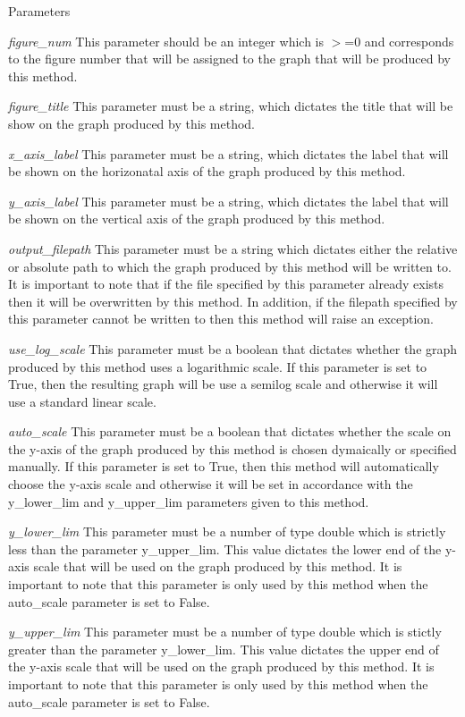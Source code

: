 \begin{DoxyParams}{Parameters}
\item[{\em figure\_\-num}]This parameter should be an integer which is $>$=0 and corresponds to the figure number that will be assigned to the graph that will be produced by this method. \item[{\em figure\_\-title}]This parameter must be a string, which dictates the title that will be show on the graph produced by this method. \item[{\em x\_\-axis\_\-label}]This parameter must be a string, which dictates the label that will be shown on the horizonatal axis of the graph produced by this method. \item[{\em y\_\-axis\_\-label}]This parameter must be a string, which dictates the label that will be shown on the vertical axis of the graph produced by this method. \item[{\em output\_\-filepath}]This parameter must be a string which dictates either the relative or absolute path to which the graph produced by this method will be written to. It is important to note that if the file specified by this parameter already exists then it will be overwritten by this method. In addition, if the filepath specified by this parameter cannot be written to then this method will raise an exception. \item[{\em use\_\-log\_\-scale}]This parameter must be a boolean that dictates whether the graph produced by this method uses a logarithmic scale. If this parameter is set to True, then the resulting graph will be use a semilog scale and otherwise it will use a standard linear scale. \item[{\em auto\_\-scale}]This parameter must be a boolean that dictates whether the scale on the y-\/axis of the graph produced by this method is chosen dymaically or specified manually. If this parameter is set to True, then this method will automatically choose the y-\/axis scale and otherwise it will be set in accordance with the y\_\-lower\_\-lim and y\_\-upper\_\-lim parameters given to this method. \item[{\em y\_\-lower\_\-lim}]This parameter must be a number of type double which is strictly less than the parameter y\_\-upper\_\-lim. This value dictates the lower end of the y-\/axis scale that will be used on the graph produced by this method. It is important to note that this parameter is only used by this method when the auto\_\-scale parameter is set to False. \item[{\em y\_\-upper\_\-lim}]This parameter must be a number of type double which is stictly greater than the parameter y\_\-lower\_\-lim. This value dictates the upper end of the y-\/axis scale that will be used on the graph produced by this method. It is important to note that this parameter is only used by this method when the auto\_\-scale parameter is set to False. \end{DoxyParams}
